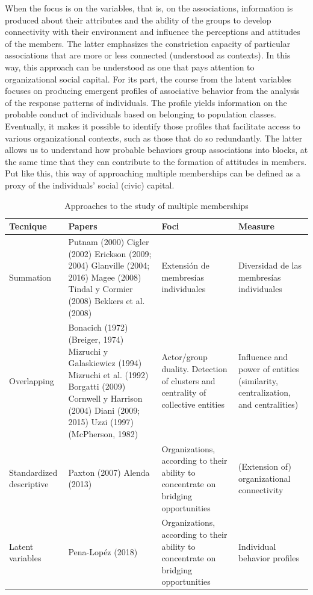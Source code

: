 When the focus is on the variables, that is, on the associations, information is produced about their attributes and the ability of the groups to develop connectivity with their environment and influence the perceptions and attitudes of the members. The latter emphasizes the constriction capacity of particular associations that are more or less connected (understood as contexts). In this way, this approach can be understood as one that pays attention to organizational social capital. For its part, the course from the latent variables focuses on producing emergent profiles of associative behavior from the analysis of the response patterns of individuals. The profile yields information on the probable conduct of individuals based on belonging to population classes. Eventually, it makes it possible to identify those profiles that facilitate access to various organizational contexts, such as those that do so redundantly. The latter allows us to understand how probable behaviors group associations into blocks, at the same time that they can contribute to the formation of attitudes in members. Put like this, this way of approaching multiple memberships can be defined as a proxy of the individuals' social (civic) capital.
\bigskip

\begin{table}[H]
\footnotesize 
\label{table: table1}
\setlength{\tymin}{40pt} %
\let\raggedright\RaggedRight

\begin{tabulary}{\textwidth}{@{}LLLL@{}}
\toprule
\textbf{Tecnique} &
  \textbf{Papers} &
  \textbf{Foci} &
  \textbf{Measure} \\
\midrule
Summation    & Putnam (2000) Cigler (2002) Erickson (2009; 2004) Glanville (2004; 2016) Magee (2008) Tindal y Cormier (2008) Bekkers et al. (2008) 
             & Extensión de membresías individuales
             & Diversidad de las membresías individuales\\

Overlapping  & Bonacich (1972) (Breiger, 1974) Mizruchi y Galaskiewicz (1994) Mizruchi et al. (1992) Borgatti (2009) Cornwell y Harrison (2004) Diani (2009; 2015) Uzzi (1997) (McPherson, 1982) 
             & Actor/group duality. Detection of clusters and centrality of collective entities
             & Influence and power of entities (similarity, centralization, and centralities)\\
Standardized descriptive  & Paxton (2007) Alenda (2013) 
                          & Organizations, according to their ability to concentrate on bridging opportunities
                          & (Extension of) organizational connectivity\\
Latent variables  & Pena-Lopéz (2018)  
                  & Organizations, according to their ability to concentrate on bridging opportunities
                  & Individual behavior profiles\\
\bottomrule
\end{tabulary}

\caption{Approaches to the study of multiple memberships}
\label{}

\end{table}


